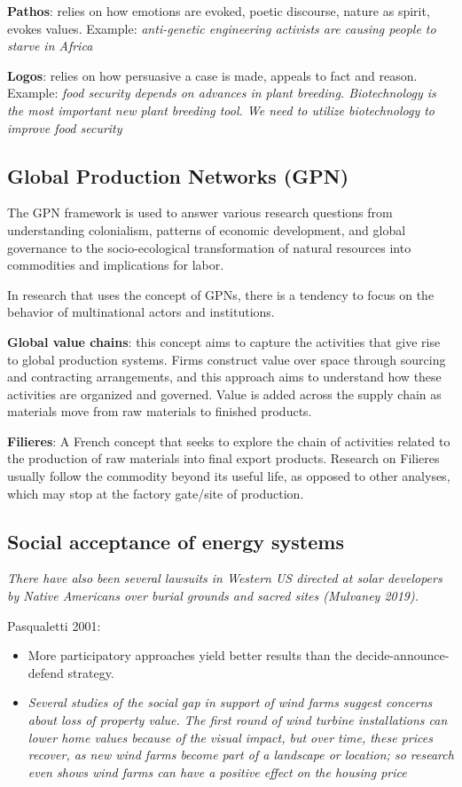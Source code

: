 \textbf{Pathos}: relies on how emotions are evoked, poetic discourse, nature as
spirit, evokes values. Example: \textit{anti-genetic engineering activists are
causing people to starve in Africa}

\textbf{Logos}: relies on how persuasive a case is made, appeals to fact and
reason. Example: \textit{food security depends on advances in plant breeding.
Biotechnology is the most important new plant breeding tool. We need to
utilize biotechnology to improve food security}

\subsection{Global Production Networks (GPN)}

The GPN framework is used to answer various research questions from
understanding colonialism, patterns of economic development, and global
governance to the socio-ecological transformation of natural resources into
commodities and implications for labor.

In research that uses the concept of GPNs, there is a tendency to focus on the
behavior of multinational actors and institutions.

\textbf{Global value chains}: this concept aims to capture the activities that
give rise to global production systems. Firms construct value over space
through sourcing and contracting arrangements, and this approach aims to
understand how these activities are organized and governed. Value is added
across the supply chain as materials move from raw materials to finished
products.

\textbf{Filieres}: A French concept that seeks to explore the chain of
activities related to the production of raw materials into final export
products. Research on Filieres usually follow the commodity beyond its useful
life, as opposed to other analyses, which may stop at the factory gate/site
of production.

\subsection{Social acceptance of energy systems}

\textit{There have also been several lawsuits in Western US directed
at solar developers by Native Americans over burial grounds and sacred sites
(Mulvaney 2019).}

Pasqualetti 2001:

\begin{itemize}
	\item More participatory approaches yield better results than the
	decide-announce-defend strategy.
	\item \textit{Several studies of the social gap in support of wind
	farms suggest concerns about loss of property value. The first round
	of wind turbine installations can lower home values because of the 
	visual impact, but over time, these prices recover,
	as new wind farms become part of a landscape or location; so research
	even shows wind farms can have a positive effect on the housing price}
\end{itemize}

